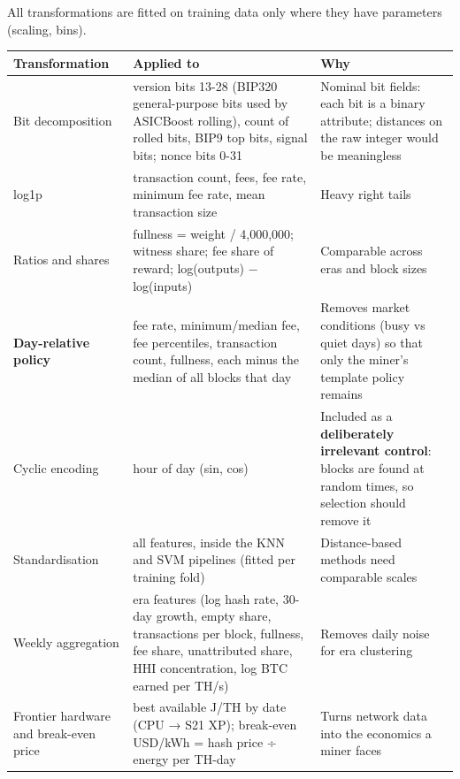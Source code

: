 \documentclass[
  11pt,
  a4paper,
]{article}
\newenvironment{reporttable}{\par\small\sffamily}{\par}
\begin{document}
All transformations are fitted on training data only where they have
parameters (scaling, bins).

\begin{reporttable}

\begin{longtable}[]{@{}
  >{\raggedright\arraybackslash}p{}
  >{\raggedright\arraybackslash}p{}
  >{\raggedright\arraybackslash}p{}@{}}
\toprule\noalign{}
\begin{minipage}[b]{\linewidth}\raggedright
\textbf{Transformation}
\end{minipage} & \begin{minipage}[b]{\linewidth}\raggedright
\textbf{Applied to}
\end{minipage} & \begin{minipage}[b]{\linewidth}\raggedright
\textbf{Why}
\end{minipage} \\
\midrule\noalign{}
\endhead
\bottomrule\noalign{}
\endlastfoot
Bit decomposition & version bits 13-28 (BIP320 general-purpose bits used
by ASICBoost rolling), count of rolled bits, BIP9 top bits, signal bits;
nonce bits 0-31 & Nominal bit fields: each bit is a binary attribute;
distances on the raw integer would be meaningless \\
log1p & transaction count, fees, fee rate, minimum fee rate, mean
transaction size & Heavy right tails \\
Ratios and shares & fullness = weight / 4,000,000; witness share; fee
share of reward; log(outputs) − log(inputs) & Comparable across eras and
block sizes \\
\textbf{Day-relative policy} & fee rate, minimum/median fee, fee
percentiles, transaction count, fullness, each minus the median of all
blocks that day & Removes market conditions (busy vs quiet days) so that
only the miner's template policy remains \\
Cyclic encoding & hour of day (sin, cos) & Included as a
\textbf{deliberately irrelevant control}: blocks are found at random
times, so selection should remove it \\
Standardisation & all features, inside the KNN and SVM pipelines (fitted
per training fold) & Distance-based methods need comparable scales \\
Weekly aggregation & 9 era features (log hash rate, 30-day growth, empty
share, transactions per block, fullness, fee share, unattributed share,
HHI concentration, log BTC earned per TH/s) & Removes daily noise for
era clustering \\
Frontier hardware and break-even price & best available J/TH by date
(CPU → S21 XP); break-even USD/kWh = hash price ÷ energy per TH-day &
Turns network data into the economics a miner faces \\
\end{longtable}

\end{reporttable}
\end{document}
